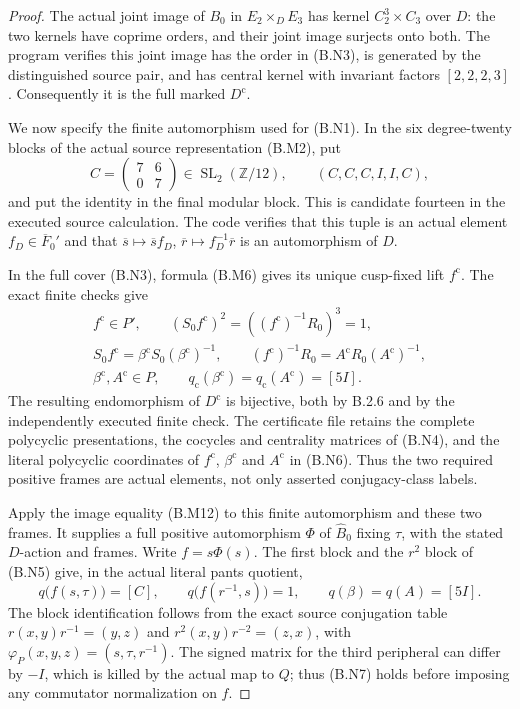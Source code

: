 \begin{proof}
The actual joint image of $B_0$ in $E_2\times_D E_3$
has kernel $C_2^3\times C_3$ over $D$: the two kernels
have coprime orders, and their joint image surjects
onto both.  The program verifies this joint image
has the order in (B.N3), is generated by the
distinguished source pair, and has central kernel
with invariant factors $[2,2,2,3]$.  Consequently it
is the full marked $D^{\mathrm c}$.

We now specify the finite automorphism used for (B.N1).
In the six degree-twenty blocks of the actual source
representation (B.M2), put
\[
 C=\begin{pmatrix}7&6\\0&7\end{pmatrix}
       \in\operatorname{SL}_2(\mathbb Z/12),
 \qquad (C,C,C,I,I,C),                           \tag{B.N5}
\]
and put the identity in the final modular block.
This is candidate fourteen in the executed source
calculation.  The code verifies that this tuple is
an actual element $f_D\in\overline F_0'$ and that
$\overline s\mapsto\overline s f_D$,
$\overline r\mapsto f_D^{-1}\overline r$ is an
automorphism of $D$.

In the full cover (B.N3), formula (B.M6) gives its
unique cusp-fixed lift $f^{\mathrm c}$.  The exact
finite checks give
\[
\begin{gathered}
 f^{\mathrm c}\in P',\qquad
 (S_0f^{\mathrm c})^2=((f^{\mathrm c})^{-1}R_0)^3=1,\\
 S_0f^{\mathrm c}=\beta^{\mathrm c}S_0
                     (\beta^{\mathrm c})^{-1},\qquad
 (f^{\mathrm c})^{-1}R_0=A^{\mathrm c}R_0
                     (A^{\mathrm c})^{-1},\\
 \beta^{\mathrm c},A^{\mathrm c}\in P,
 \qquad q_{\mathrm c}(\beta^{\mathrm c})
       =q_{\mathrm c}(A^{\mathrm c})=[5I].        \tag{B.N6}
\end{gathered}
\]
The resulting endomorphism of $D^{\mathrm c}$ is
bijective, both by B.2.6 and by the independently
executed finite check.  The certificate file retains
the complete polycyclic presentations, the cocycles
and centrality matrices of (B.N4), and the literal
polycyclic coordinates of $f^{\mathrm c}$,
$\beta^{\mathrm c}$ and $A^{\mathrm c}$ in (B.N6).
Thus the two required positive frames are actual
elements, not only asserted conjugacy-class labels.

Apply the image equality (B.M12) to this finite
automorphism and these two frames.  It supplies a
full positive automorphism $\Phi$ of $\widehat B_0$
fixing $\tau$, with the stated $D$-action and frames.
Write $f=s\Phi(s)$.  The first block and the
$r^2$ block of (B.N5) give, in the actual literal
pants quotient,
\[
 q\bigl(f(s,\tau)\bigr)=[C],\qquad
 q\bigl(f(r^{-1},s)\bigr)=1,
 \qquad q(\beta)=q(A)=[5I].                    \tag{B.N7}
\]
The block identification follows from the exact
source conjugation table
$r(x,y)r^{-1}=(y,z)$ and
$r^2(x,y)r^{-2}=(z,x)$, with
$\varphi_P(x,y,z)=(s,\tau,r^{-1})$.
The signed matrix for the third peripheral can
differ by $-I$, which is killed by the actual map
to $Q$; thus (B.N7) holds before imposing any
commutator normalization on $f$.


\end{proof}
